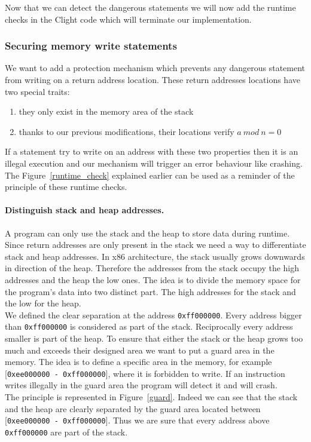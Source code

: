 \documentclass[11pt]{sdm}
\begin{document}
Now that we can detect the dangerous statements we will now add the runtime checks in the Clight code which will terminate our implementation.

\subsubsection{Securing memory write statements}
\label{ssub:implem_check_address}
We want to add a protection mechanism which prevents any dangerous statement from writing on a return address location. These return addresses locations have two special traits:
\begin{enumerate}
	\item they only exist in the memory area of the stack
	\item thanks to our previous modifications, their locations verify $a~mod~n=0$
\end{enumerate}
If a statement try to write on an address with these two properties then it is an illegal execution and our mechanism will trigger an error behaviour like crashing. The Figure~\ref{runtime_check} explained earlier can be used as a reminder of the principle of these runtime checks.

\paragraph{Distinguish stack and heap addresses.}
\label{par:Distinguish stack or heap}
A program can only use the stack and the heap to store data during runtime. Since return addresses are only present in the stack we need a way to differentiate stack and heap addresses.
In x86 architecture, the stack usually grows downwards in direction of the heap. Therefore the addresses from the stack occupy the high addresses and the heap the low ones. 
The idea is to divide the memory space for the program's data into two distinct part. The high addresses for the stack and the low for the heap. \\
We defined the clear separation at the address \texttt{0xff000000}. Every address bigger than \texttt{0xff000000} is considered as part of the stack. Reciprocally every address smaller is part of the heap.
To ensure that either the stack or the heap grows too much and exceeds their designed area we want to put a guard area in the memory. The idea is to define a specific area in the memory, for example [\texttt{0xee000000 - \texttt{0xff000000}}], where it is forbidden to write. If an instruction writes illegally in the guard area the program will detect it and will crash.\\
The principle is represented in Figure~\ref{guard}. Indeed we can see that the stack and the heap are clearly separated by the guard area located between [\texttt{0xee000000 - \texttt{0xff000000}}]. Thus we are sure that every address above \texttt{0xff000000} are part of the stack.
\end{document}
